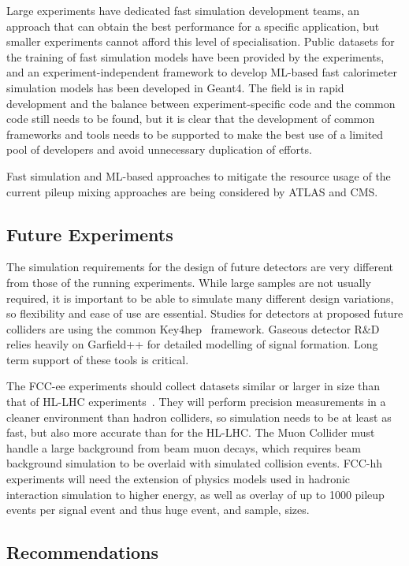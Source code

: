 \documentclass[10pt,a4paper]{article}
\begin{document}
Large experiments have dedicated fast simulation development teams, an approach
that can obtain the best performance for a specific application, but smaller
experiments cannot afford this level of specialisation. Public datasets for the
training of fast simulation models have been provided by the experiments, and an
experiment-independent framework to develop ML-based fast calorimeter simulation
models has been developed in Geant4. The field is in rapid development and the
balance between experiment-specific code and the common code still needs to be
found, but it is clear that the development of common frameworks and tools needs
to be supported to make the best use of a limited pool of developers and avoid
unnecessary duplication of efforts.

Fast simulation and ML-based approaches to mitigate the resource usage
of the current pileup mixing approaches are being considered by ATLAS
and CMS.

\subsection{Future Experiments}\label{future-experiments}

The simulation requirements for the design of future detectors are very
different from those of the running experiments. While large samples are not
usually required, it is important to be able to simulate many
different design variations, so flexibility and ease of use are
essential. Studies for detectors at proposed future colliders are using
the common Key4hep~\cite{Ganis2022} framework. Gaseous detector R\&D relies
heavily on Garfield++\cite{garfield++} for detailed modelling of signal
formation. Long term support of these tools is critical.

The FCC-ee experiments should collect datasets similar or
larger in size than that of HL-LHC experiments~\cite{FCCee-Resources}. They will perform precision
measurements in a cleaner environment than hadron colliders, so simulation
needs to be at least as fast, but also more accurate than for the HL-LHC. The
Muon Collider must handle a large background from beam muon decays, which
requires beam background simulation to be overlaid with simulated collision
events. FCC-hh experiments will need the extension of physics models used in
hadronic interaction simulation to higher energy, as well as overlay of up to
1000 pileup events per signal event and thus huge event, and sample, sizes.

\subsection{Recommendations}\label{recommendations-1}
\end{document}
